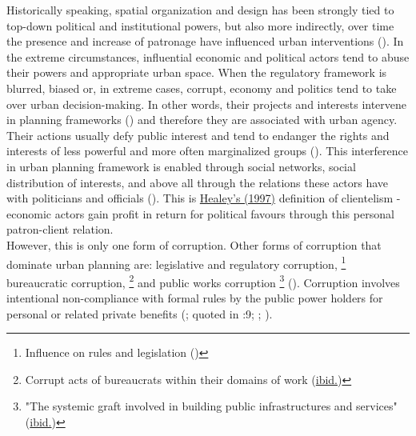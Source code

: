 \documentclass[11pt]{report}
\begin{document}
Historically speaking, spatial organization and design has been strongly tied to top-down political and institutional powers, but also more indirectly, over time the presence and increase of patronage have influenced urban interventions
(\href{Van}{\citealt{Van_power_2013}}).
In the extreme circumstances, influential economic and political actors tend to abuse their powers and appropriate urban space.
When the regulatory framework is blurred, biased or, in extreme cases, corrupt, economy and politics tend to take over urban decision-making.
In other words, their projects and interests intervene in planning frameworks
(\href{Hudson}{\citealt{Hudson_political_2014}}) and therefore they are associated with urban agency.
\\

Their actions usually defy public interest and tend to endanger the rights and interests of less powerful and more often marginalized groups (\href{Sager}{\citealt{Sager_logic_2006}}).
This interference in urban planning framework is enabled through social networks, social distribution of interests, and above all through the relations these actors have with politicians and officials
(\href{Healey}{\citealt{healey_collaborative_1997}}).
This is \href{Healey}{Healey's (1997)} definition of clientelism - economic actors gain profit in return for political favours through this personal patron-client relation.
\\

However, this is only one form of corruption.
Other forms of corruption that dominate urban planning are:
legislative and regulatory corruption,
\footnote{Influence on rules and legislation (\href{Chiodelli}{\citealt{chiodelli_corruption_2015}})}
bureaucratic corruption,
\footnote{Corrupt acts of bureaucrats within their domains of work (\href{Chiodelli}{ibid.})}
and
public works corruption
\footnote{"The systemic graft involved in building public infrastructures and services" (\href{Chiodelli}{ibid.})}
(\href{Chiodelli}{\citealt{chiodelli_corruption_2015}}).
Corruption involves intentional  non-compliance  with  formal  rules by the public power holders for personal or related private benefits
(\href{Kaufmann}{\citealt{kaufmann_XXX_1997}};
\href{Tanzi}{\citealt{Tanzi_XXXXX}} quoted in 
\href{Begovic}{\citealt{begovic_xxx_2001}}:9; \href{Grubovic}{\citealt{grubovic_belgrade_2006}};
\href{Chiodelli}{\citealt{chiodelli_corruption_2015}}).
\\
\end{document}
